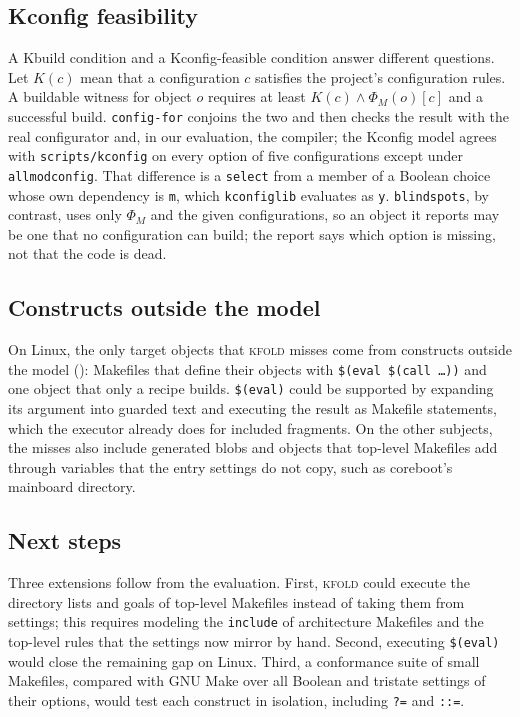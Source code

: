 \documentclass[acmsmall,screen,review]{acmart}
\newcommand{\tool}{\textsc{kfold}\xspace}
\begin{document}
\subsection{Kconfig feasibility}
A Kbuild condition and a Kconfig-feasible condition answer different questions. Let $K(c)$ mean that a configuration $c$ satisfies the project's configuration rules. A buildable witness for object $o$ requires at least $K(c)\land\Phi_M(o)[c]$ and a successful build. \texttt{config-for} conjoins the two and then checks the result with the real configurator and, in our evaluation, the compiler; the Kconfig model agrees with \texttt{scripts/kconfig} on every option of five configurations except \NKconfigMismatches under \texttt{allmodconfig}. That difference is a \texttt{select} from a member of a Boolean choice whose own dependency is \texttt{m}, which \texttt{kconfiglib} evaluates as \texttt{y}. \texttt{blindspots}, by contrast, uses only $\Phi_M$ and the given configurations, so an object it reports may be one that no configuration can build; the report says which option is missing, not that the code is dead.

\subsection{Constructs outside the model}
\label{sec:discussion:constructs}
On Linux, the only target objects that \tool misses come from constructs outside the model (): Makefiles that define their objects with \texttt{\$(eval \$(call \ldots))} and one object that only a recipe builds. \texttt{\$(eval)} could be supported by expanding its argument into guarded text and executing the result as Makefile statements, which the executor already does for included fragments. On the other subjects, the misses also include generated blobs and objects that top-level Makefiles add through variables that the entry settings do not copy, such as coreboot's mainboard directory.

\subsection{Next steps}
Three extensions follow from the evaluation. First, \tool could execute the directory lists and goals of top-level Makefiles instead of taking them from settings; this requires modeling the \texttt{include} of architecture Makefiles and the top-level rules that the settings now mirror by hand. Second, executing \texttt{\$(eval)} would close the remaining gap on Linux. Third, a conformance suite of small Makefiles, compared with GNU Make over all Boolean and tristate settings of their options, would test each construct in isolation, including \texttt{?=} and \texttt{::=}.
\end{document}
